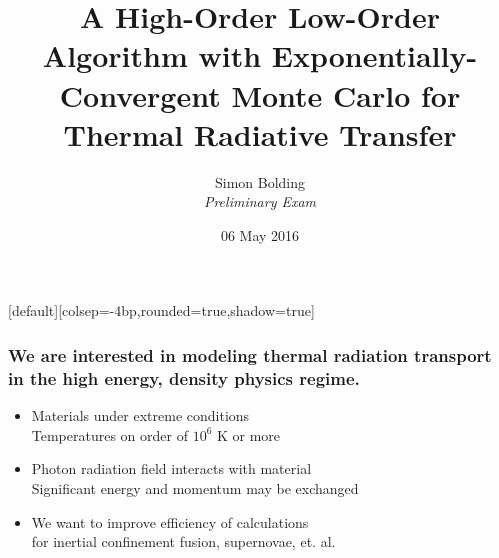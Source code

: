 \documentclass[xcolor=dvipsnames,hyperref={pdfpagelabels=false},unknownkeysallowed]{beamer}
\title[HOLO for TRT]{A High-Order Low-Order Algorithm with Exponentially-Convergent Monte Carlo for
    Thermal Radiative Transfer}
\author[S.R. Bolding]{{Simon Bolding \\ \vspace{1.0em}\emph{Preliminary Exam}}}
\date{{06 May 2016} }
\newcommand{\colb}[1]{{\color{blue} #1}}
\newcommand{\colG}[1]{{\color{Gray} #1}}
\newlength{\wideitemsep}
\let\olditem\item
\renewcommand{\item}{\setlength{\itemsep}{\wideitemsep}\olditem}
\begin{document}
[default][colsep=-4bp,rounded=true,shadow=true]

\def\beginpage{\null\vfill\bgroup
\offinterlineskip\leftskip=\z@}
\def\endpage{\egroup\eject}

\begin{frame}
    \titlepage \vspace{-0.213in}
    \begin{center}
    \end{center}    
\end{frame}

\setlength{\tabcolsep}{6pt}



\begin{frame}
\frametitle{We are interested in modeling thermal radiation transport \\ in the high energy,
    density physics regime.}
    \addtolength{\wideitemsep}{0.08in}
\begin{itemize}
    \item[] Materials under extreme conditions \\ \colG{Temperatures on order of $10^6$ K or more}
    \item[] Photon radiation field interacts with material \\ 
        \colG{Significant \colb{energy} and momentum may be exchanged}
 \item[] We want to improve efficiency of calculations \\
     \colG{for inertial confinement fusion, supernovae, et. al.}
    \end{itemize}
\end{frame}
\end{document}
